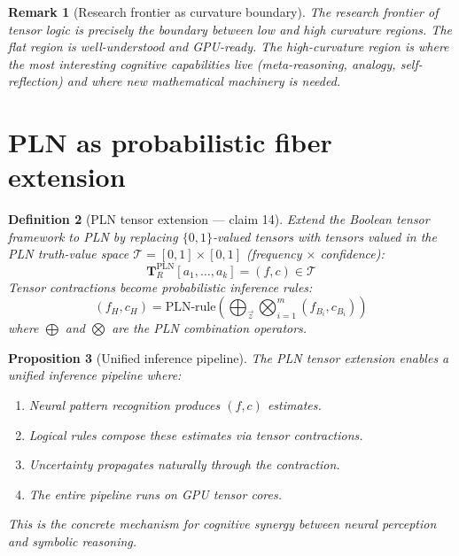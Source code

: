 \documentclass[11pt,a4paper]{article}
\newtheorem{definition}{Definition}[section]
\newtheorem{proposition}[definition]{Proposition}
\newtheorem{remark}[definition]{Remark}
\begin{document}
\begin{remark}[Research frontier as curvature boundary]
The research frontier of tensor logic is precisely the boundary between
low and high curvature regions. The flat region is well-understood and
GPU-ready. The high-curvature region is where the most interesting
cognitive capabilities live (meta-reasoning, analogy, self-reflection)
and where new mathematical machinery is needed.
\end{remark}

\section{PLN as probabilistic fiber extension}
\label{sec:pln}

\begin{definition}[PLN tensor extension --- claim 14]
\label{def:pln-tensor}
Extend the Boolean tensor framework to PLN by replacing
$\{0, 1\}$-valued tensors with tensors valued in the PLN truth-value
space $\mathcal{T} = [0,1] \times [0,1]$ (frequency $\times$ confidence):
\[
  \mathbf{T}_R^{\text{PLN}}[a_1, \ldots, a_k] = (f, c) \in \mathcal{T}
\]
Tensor contractions become probabilistic inference rules:
\[
  (f_H, c_H) = \text{PLN-rule}\!\left(
    \bigoplus_{\vec{z}} \bigotimes_{i=1}^m (f_{B_i}, c_{B_i})
  \right)
\]
where $\bigoplus$ and $\bigotimes$ are the PLN combination operators.
\end{definition}

\begin{proposition}[Unified inference pipeline]
\label{prop:unified}
The PLN tensor extension enables a unified inference pipeline where:
\begin{enumerate}
\item Neural pattern recognition produces $(f, c)$ estimates.
\item Logical rules compose these estimates via tensor contractions.
\item Uncertainty propagates naturally through the contraction.
\item The entire pipeline runs on GPU tensor cores.
\end{enumerate}
This is the concrete mechanism for cognitive synergy between neural
perception and symbolic reasoning.
\end{proposition}

\end{document}
